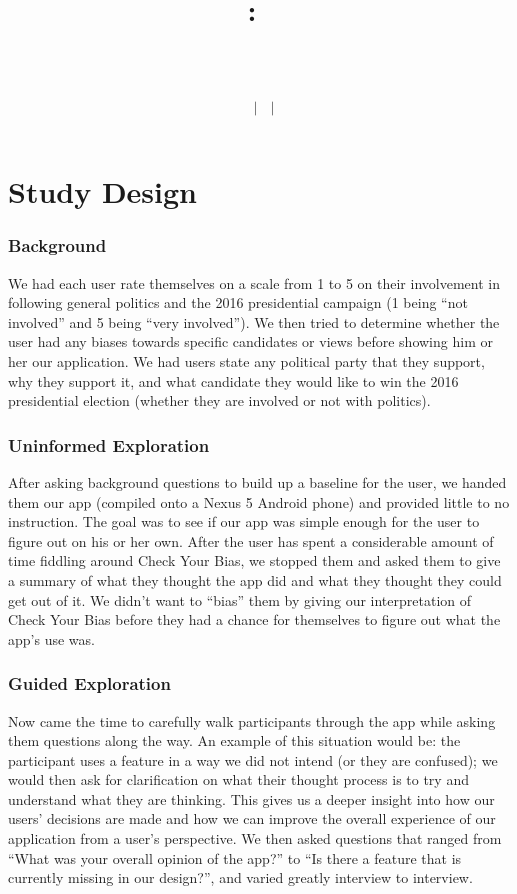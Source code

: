 \documentclass[11pt]{article}
\title{
    \vspace{2in}
    \textmd{\textbf{\hmwkClass:\ \hmwkTitle}}\\
    \vspace{0.1in}\large{\textit{\hmwkClassInstructor\ \hmwkClassTime}}\\
    \author{\textbf{\hmwkAuthorName\ $\vert$ \hmwkAuthorCSE\ $\vert$ \hmwkAuthorId}}
}
\date{}
\begin{document}
\section*{Study Design}

\subsubsection*{Background}

We had each user rate themselves on a scale from 1 to 5 on their involvement in following general politics and the 2016 presidential campaign (1 being ``not involved'' and 5 being ``very involved''). We then tried to determine whether the user had any biases towards specific candidates or views before showing him or her our application. We had users state any political party that they support, why they support it, and what candidate they would like to win the 2016 presidential election (whether they are involved or not with politics).

\subsubsection*{Uninformed Exploration}

After asking background questions to build up a baseline for the user, we handed them our app (compiled onto a Nexus 5 Android phone) and provided little to no instruction. The goal was to see if our app was simple enough for the user to figure out on his or her own. After the user has spent a considerable amount of time fiddling around Check Your Bias, we stopped them and asked them to give a summary of what they thought the app did and what they thought they could get out of it. We didn't want to ``bias'' them by giving our interpretation of Check Your Bias before they had a chance for themselves to figure out what the app's use was.

\subsubsection*{Guided Exploration}

Now came the time to carefully walk participants through the app while asking them questions along the way. An example of this situation would be: the participant uses a feature in a way we did not intend (or they are confused); we would then ask for clarification on what their thought process is to try and understand what they are thinking. This gives us a deeper insight into how our users' decisions are made and how we can improve the overall experience of our application from a user's perspective. We then asked questions that ranged from ``What was your overall opinion of the app?'' to ``Is there a feature that is currently missing in our design?'', and varied greatly interview to interview.
\end{document}
